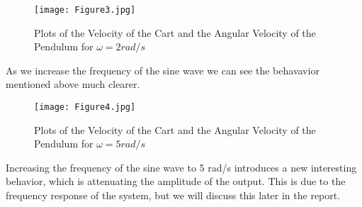 \documentclass[11pt, twoside, letterpaper]{article}   	%
\begin{document}
\begin{figure}[htbp]
\begin{center}
\texttt{[image: Figure3.jpg]}
\caption{Plots of the Velocity of the Cart and the Angular Velocity of the Pendulum for $\omega = 2 rad/s$}
\label{default}
\end{center}
\end{figure}
\FloatBarrier
As we increase the frequency of the sine wave we can see the behavavior mentioned above much clearer.

\begin{figure}[htbp]
\begin{center}
\texttt{[image: Figure4.jpg]}
\caption{Plots of the Velocity of the Cart and the Angular Velocity of the Pendulum for $\omega = 5 rad/s$}
\label{default}
\end{center}
\end{figure}
\FloatBarrier
Increasing the frequency of the sine wave to 5 rad/s introduces a new interesting behavior, which is attenuating 
the amplitude of the output. This is due to the frequency response of the system, but we will discuss this later
in the report.
\end{document}
